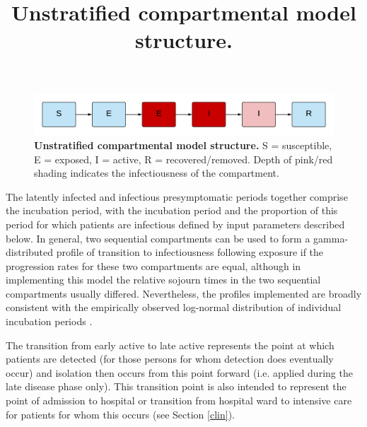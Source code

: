 \begin{figure}[ht]
    \includegraphics[width=\textwidth]{../covid_19/covid_19_seeiir.pdf}
   \title{Unstratified compartmental model structure.}
    \caption{\textbf{Unstratified compartmental model structure.} S = susceptible, E = exposed, I = active, R = recovered/removed. Depth of pink/red shading indicates the infectiousness of the compartment.}
    \label{fig:seeiir}
\end{figure}

The latently infected and infectious presymptomatic periods together comprise the incubation period, with the incubation period and the proportion of this period for which patients are infectious defined by input parameters described below. In general, two sequential compartments can be used to form a gamma-distributed profile of transition to infectiousness following exposure if the progression rates for these two compartments are equal, although in implementing this model the relative sojourn times in the two sequential compartments usually differed. Nevertheless, the profiles implemented are broadly consistent with the empirically observed log-normal distribution of individual incubation periods \cite{RN13}.

The transition from early active to late active represents the point at which patients are detected (for those persons for whom detection does eventually occur) and isolation then occurs from this point forward (i.e. applied during the late disease phase only). This transition point is also intended to represent the point of admission to hospital or transition from hospital ward to intensive care for patients for whom this occurs (see Section \ref{clin}).
